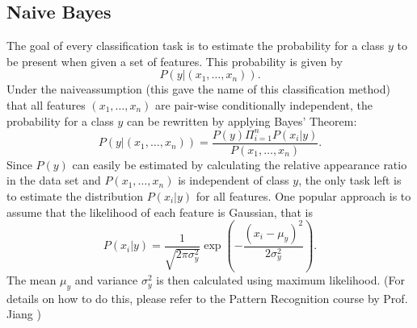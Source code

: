 \subsection{Naive Bayes}
The goal of every classification task is to estimate the probability for a class $y$ to be present when given a set of features. This probability is given by
\begin{equation}
	P(y|(x_1,\dots,x_n)).
\end{equation}
Under the \glqq naive\grqq assumption (this gave the name of this classification method) that all features $(x_1,\dots,x_n)$ are pair-wise conditionally independent, the probability for a class $y$ can be rewritten by applying Bayes' Theorem:
\begin{equation}
	P(y|(x_1,\dots,x_n)) = \frac{P(y)\Pi_{i=1}^{n} P(x_i|y)}{P(x_1,\dots,x_n)}.
\end{equation}
Since $P(y)$ can easily be estimated by calculating the relative appearance ratio in the data set and $P(x_1,\dots,x_n)$ is independent of class $y$, the only task left is to estimate the distribution $P(x_i|y)$ for all features. One popular approach is to assume that the likelihood of each feature is Gaussian, that is
\begin{equation}
	P(x_i|y) = \frac{1}{\sqrt{2\pi \sigma_y^2}}\exp\left(-\frac{(x_i-\mu_y)^2}{2\sigma_y^2}\right).
\end{equation}
The mean $\mu_y$ and variance $\sigma_y^2$ is then calculated using maximum likelihood. (For details on how to do this, please refer to the Pattern Recognition course by Prof. Jiang \cite{Jiang})